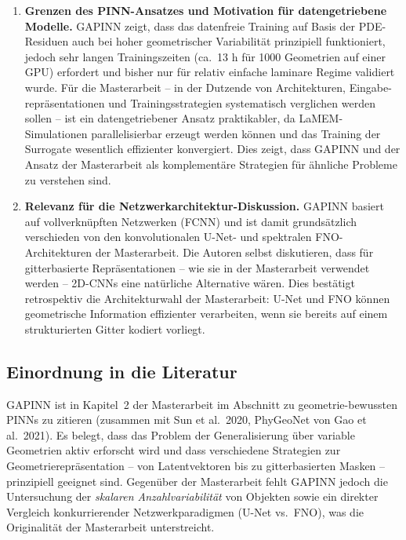 \documentclass[a4paper,12pt]{article}
\begin{document}
\begin{enumerate}
\item \textbf{Grenzen des PINN-Ansatzes und Motivation f\"ur datengetriebene
Modelle.}
GAPINN zeigt, dass das datenfreie Training auf Basis der PDE-Residuen auch
bei hoher geometrischer Variabilit\"at prinzipiell funktioniert, jedoch
sehr langen Trainingszeiten (ca.\ 13 h f\"ur 1000 Geometrien auf einer GPU)
erfordert und bisher nur f\"ur relativ einfache laminare Regime validiert
wurde. F\"ur die Masterarbeit -- in der Dutzende von Architekturen, Eingabe-
repr\"asentationen und Trainingsstrategien systematisch verglichen werden
sollen -- ist ein datengetriebener Ansatz praktikabler, da LaMEM-Simulationen
parallelisierbar erzeugt werden k\"onnen und das Training der Surrogate
wesentlich effizienter konvergiert. Dies zeigt, dass GAPINN und der Ansatz
der Masterarbeit als komplement\"are Strategien f\"ur \"ahnliche Probleme
zu verstehen sind.

\item \textbf{Relevanz f\"ur die Netzwerkarchitektur-Diskussion.}
GAPINN basiert auf vollverkn\"upften Netzwerken (FCNN) und ist damit
grunds\"atzlich verschieden von den konvolutionalen U-Net- und
spektralen FNO-Architekturen der Masterarbeit. Die Autoren selbst
diskutieren, dass f\"ur gitterbasierte Repr\"asentationen -- wie sie in
der Masterarbeit verwendet werden -- 2D-CNNs eine nat\"urliche Alternative
w\"aren. Dies best\"atigt retrospektiv die Architekturwahl der Masterarbeit:
U-Net und FNO k\"onnen geometrische Information effizienter verarbeiten,
wenn sie bereits auf einem strukturierten Gitter kodiert vorliegt.

\end{enumerate}

\subsection*{Einordnung in die Literatur}

GAPINN ist in Kapitel~2 der Masterarbeit im Abschnitt zu geometrie-bewussten
PINNs zu zitieren (zusammen mit Sun et al.\ 2020, PhyGeoNet von Gao et al.\
2021). Es belegt, dass das Problem der Generalisierung \"uber variable
Geometrien aktiv erforscht wird und dass verschiedene Strategien zur
Geometrierepr\"asentation -- von Latentvektoren bis zu gitterbasierten Masken
-- prinzipiell geeignet sind. Gegen\"uber der Masterarbeit fehlt GAPINN
jedoch die Untersuchung der \emph{skalaren Anzahlvariabilit\"at} von Objekten
sowie ein direkter Vergleich konkurrierender Netzwerkparadigmen (U-Net vs.\
FNO), was die Originalit\"at der Masterarbeit unterstreicht.
\end{document}
